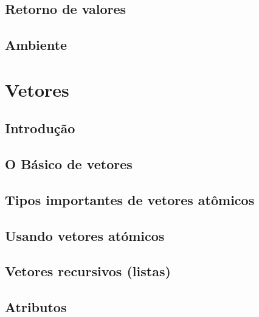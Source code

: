 \documentclass[
]{latex/krantz}
\theoremstyle{definition}
\theoremstyle{definition}
\theoremstyle{definition}
\theoremstyle{definition}
\theoremstyle{remark}
\begin{document}
\hypertarget{retorno-de-valores}{%
\section{Retorno de valores}\label{retorno-de-valores}}

\hypertarget{ambiente}{%
\section{Ambiente}\label{ambiente}}

\hypertarget{vetores}{%
\chapter{Vetores}\label{vetores}}

\hypertarget{introduuxe7uxe3o-12}{%
\section{Introdução}\label{introduuxe7uxe3o-12}}

\hypertarget{o-buxe1sico-de-vetores}{%
\section{O Básico de vetores}\label{o-buxe1sico-de-vetores}}

\hypertarget{tipos-importantes-de-vetores-atuxf4micos}{%
\section{Tipos importantes de vetores atômicos}\label{tipos-importantes-de-vetores-atuxf4micos}}

\hypertarget{usando-vetores-atuxf3micos}{%
\section{Usando vetores atómicos}\label{usando-vetores-atuxf3micos}}

\hypertarget{vetores-recursivos-listas}{%
\section{Vetores recursivos (listas)}\label{vetores-recursivos-listas}}

\hypertarget{atributos}{%
\section{Atributos}\label{atributos}}
\end{document}

